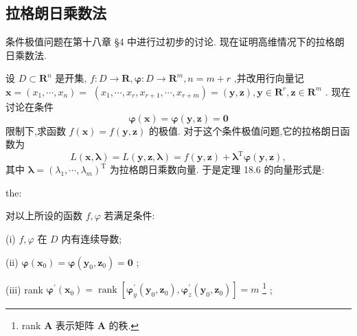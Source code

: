 \subsection{拉格朗日乘数法}

条件极值问题在第十八章 §4 中进行过初步的讨论. 现在证明高维情况下的拉格朗日乘数法.

设 \(D \subset  {\mathbf{R}}^{n}\) 是开集, \(f : D \rightarrow  \mathbf{R},\mathbf{\varphi } : D \rightarrow  {\mathbf{R}}^{m},n = m + r\) ,并改用行向量记 \(\mathbf{x} = \left( {{x}_{1},\cdots ,{x}_{n}}\right)  =\)  \(\left( {{x}_{1},\cdots ,{x}_{r},{x}_{r + 1},\cdots ,{x}_{r + m}}\right)  = \left( {\mathbf{y},\mathbf{z}}\right) ,\mathbf{y} \in  {\mathbf{R}}^{r},\mathbf{z} \in  {\mathbf{R}}^{m}\) . 现在讨论在条件
\[
\mathbf{\varphi }\left( \mathbf{x}\right)  = \mathbf{\varphi }\left( {\mathbf{y},\mathbf{z}}\right)  = \mathbf{0} \tag{25}
\]
限制下,求函数 \(f\left( \mathbf{x}\right)  = f\left( {\mathbf{y},\mathbf{z}}\right)\) 的极值. 对于这个条件极值问题,它的拉格朗日函数为
\[
L\left( {\mathbf{x},\mathbf{\lambda }}\right)  = L\left( {\mathbf{y},\mathbf{z},\mathbf{\lambda }}\right)  = f\left( {\mathbf{y},\mathbf{z}}\right)  + {\mathbf{\lambda }}^{\mathrm{T}}\mathbf{\varphi }\left( {\mathbf{y},\mathbf{z}}\right) , \tag{26}
\]
其中 \(\mathbf{\lambda } = {\left( {\lambda }_{1},\cdots ,{\lambda }_{m}\right) }^{\mathrm{T}}\) 为拉格朗日乘数向量. 于是定理 18.6 的向量形式是:

\begin{theorem}{}{the:}

\end{theorem}
 对以上所设的函数 \(f,\varphi\) 若满足条件:

(i) \(f,\varphi\) 在 \(D\) 内有连续导数;

(ii) \(\mathbf{\varphi }\left( {\mathbf{x}}_{0}\right)  = \mathbf{\varphi }\left( {{\mathbf{y}}_{0},{\mathbf{z}}_{0}}\right)  = \mathbf{0}\) ;

(iii) rank \({\mathbf{\varphi }}^{\prime }\left( {\mathbf{x}}_{0}\right)  = \operatorname{rank}\left\lbrack  {{\mathbf{\varphi }}_{y}^{\prime }\left( {{\mathbf{y}}_{0},{\mathbf{z}}_{0}}\right) ,{\mathbf{\varphi }}_{z}^{\prime }\left( {{\mathbf{y}}_{0},{\mathbf{z}}_{0}}\right) }\right\rbrack   = {m}\) \footnote{rank \(\mathbf{A}\) 表示矩阵 \(\mathbf{A}\) 的秩.}
;

